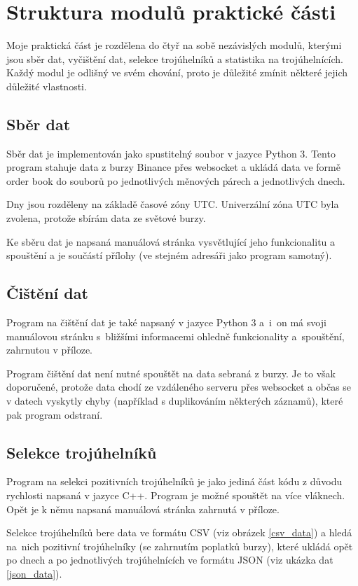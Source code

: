 \documentclass[thesis=B,czech]{FITthesis}[2019/03/21]
\begin{document}
\section{Struktura modulů praktické části}
Moje praktická část je rozdělena do čtyř na sobě nezávislých modulů, kterými jsou sběr dat, vyčištění dat, selekce trojúhelníků a statistika na trojúhelnících. Každý modul je odlišný ve svém chování, proto je důležité zmínit některé jejich důležité vlastnosti.

\subsection{Sběr dat}
Sběr dat je implementován jako spustitelný soubor v jazyce Python 3. Tento program stahuje data z burzy Binance přes websocket a ukládá data ve formě order book do souborů po jednotlivých měnových párech a jednotlivých dnech.

Dny jsou rozděleny na základě časové zóny UTC. Univerzální zóna UTC byla zvolena, protože sbírám data ze světové burzy. 

Ke sběru dat je napsaná manuálová stránka vysvětlující jeho funkcionalitu a spouštění a je součástí přílohy (ve stejném adresáři jako program samotný).

\subsection{Čištění dat}
\label{subsection:cleanup}
Program na čištění dat je také napsaný v jazyce Python 3 a~i~on má svoji manuálovou stránku s~bližšími informacemi ohledně funkcionality a~spouštění, zahrnutou v příloze. 

Program čištění dat není nutné spouštět na data sebraná z burzy. Je to však doporučené, protože data chodí ze vzdáleného serveru přes websocket a občas se v datech vyskytly chyby (například s duplikováním některých záznamů), které pak program odstraní.

\subsection{Selekce trojúhelníků}
Program na selekci pozitivních trojúhelníků je jako jediná část kódu z důvodu rychlosti napsaná v jazyce C++. Program je možné spouštět na více vláknech. Opět je k němu napsaná manuálová stránka zahrnutá v příloze. 

Selekce trojúhelníků bere data ve formátu CSV (viz obrázek \ref{csv_data}) a hledá na~nich pozitivní trojúhelníky (se zahrnutím poplatků burzy), které ukládá opět po dnech a po jednotlivých trojúhelnících ve formátu JSON (viz ukázka dat \ref{json_data}).
\end{document}
